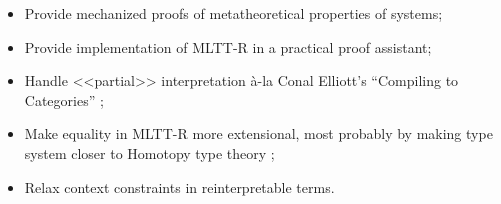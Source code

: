 \documentclass[acmsmall, review, screen, authorversion]{acmart}
\begin{document}
\begin{itemize}
    \item Provide mechanized proofs of metatheoretical properties of
        systems;
    \item Provide implementation of MLTT-R in a practical proof
        assistant;
    \item Handle <<partial>> interpretation \`a-la Conal Elliott's
        ``Compiling to Categories'' \cite{Elliott:Compcat2017};
    \item Make equality in MLTT-R more extensional, most probably by
        making type system closer to Homotopy type theory
        \cite{hottbook};
    \item Relax context constraints in reinterpretable terms.
\end{itemize}



\end{document}
